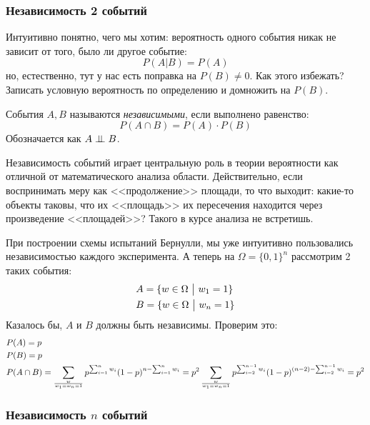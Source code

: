 \subsubsection*{Независимость 2 событий}

\begin{note}
	Интуитивно понятно, чего мы хотим: вероятность одного события никак не зависит от того, было ли другое событие:
	\[
		P(A | B) = P(A)
	\]
	но, естественно, тут у нас есть поправка на $P(B) \neq 0$. Как этого избежать? Записать условную вероятность по определению и домножить на $P(B)$.
\end{note}

\begin{definition}
	События $A, B$ называются \textit{независимыми}, если выполнено равенство:
	\[
		P(A \cap B) = P(A) \cdot P(B)
	\]
	Обозначается как $A \perp\mkern-9.5mu\perp B$.
\end{definition}

\begin{note}
	Независимость событий играет центральную роль в теории вероятности как отличной от математического анализа области. Действительно, если воспринимать меру как <<продолжение>> площади, то что выходит: какие-то объекты таковы, что их <<площадь>> их пересечения находится через произведение <<площадей>>? Такого в курсе анализа не встретишь.
\end{note}

\begin{example}
	При построении схемы испытаний Бернулли, мы уже интуитивно пользовались независимостью каждого эксперимента. А теперь на $\Omega = \{0, 1\}^n$ рассмотрим 2 таких события:
	\begin{align*}
		&{A = \{w \in \Omega \ \big|\  w_1 = 1\}}
		\\
		&{B = \{w \in \Omega \ \big|\  w_n = 1\}}
	\end{align*}
	Казалось бы, $A$ и $B$ должны быть независимы. Проверим это:
	\begin{align*}
		&{P(A) = p}
		\\
		&{P(B) = p}
		\\
		&{P(A \cap B) = \sum_{w \over w_1 = w_n = 1} p^{\sum_{i = 1}^n w_i} (1 - p)^{n - \sum_{i = 1}^n w_i}} = p^2 \sum_{w \over w_1 = w_n = 1} p^{\sum_{i = 2}^{n - 1} w_i} (1 - p)^{(n - 2) - \sum_{i = 2}^{n - 1} w_i} = p^2
	\end{align*}
\end{example}

\subsubsection*{Независимость $n$ событий}


